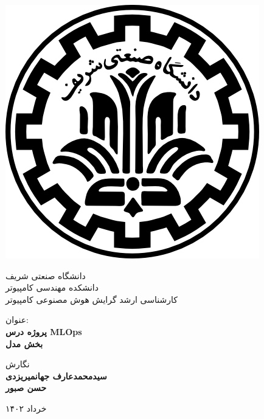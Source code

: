 
\begin{center}

    \includegraphics[scale=0.2]{resources/styles/images/logo.png}
    
    \vspace{-0.2cm}
    {دانشگاه صنعتی شریف} \\[-0.3em]
    {دانشکده مهندسی کامپیوتر}\\
    {کارشناسی ارشد گرایش هوش مصنوعی کامپیوتر}  %
    
    \begin{large}
    \vspace{0.5cm}
    
    
    \end{large}
    
    \vspace{1.3cm}
    
    {عنوان:}\\[1.2em]
    {\LARGE\textbf{پروژه درس MLOps}}\\ 
    \vspace{0.8cm}
    {\Large\textbf{بخش مدل}}
    
    \vspace{1.8cm}
    
    {نگارش}\\[.5em]
    {\large\textbf{سیدمحمدعارف جهانمیریزدی}}\\
    {\large\textbf{حسن صبور}}\\
    
    \vspace{1cm}
    
    {\normalsize خرداد ۱۴۰۲}
    
\end{center}
    
\newpage
    